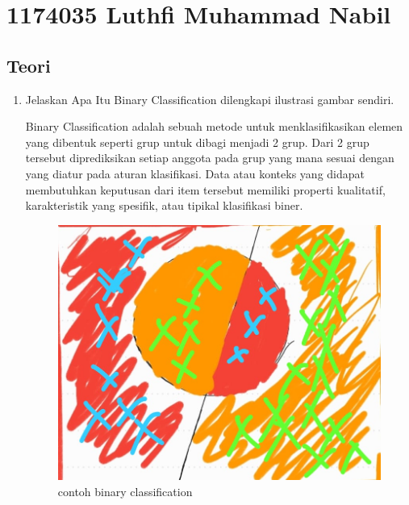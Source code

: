 \section{1174035 Luthfi Muhammad Nabil}

\subsection{Teori}
\begin{enumerate}
\item Jelaskan Apa Itu Binary Classification dilengkapi ilustrasi gambar sendiri.\par
Binary Classification adalah sebuah metode untuk menklasifikasikan elemen yang dibentuk seperti grup untuk dibagi menjadi 2 grup. Dari 2 grup tersebut diprediksikan setiap anggota pada grup yang mana sesuai dengan yang diatur pada aturan klasifikasi. Data atau konteks yang didapat membutuhkan keputusan dari item tersebut memiliki properti kualitatif, karakteristik yang spesifik, atau tipikal klasifikasi biner.
\begin{figure}[H]
\centering
\includegraphics[scale=0.2]{figures/1174035/chapter2/binary_classification.jpeg}
\caption{contoh binary classification}
\label{contoh1}
\end{figure}



\end{enumerate}
